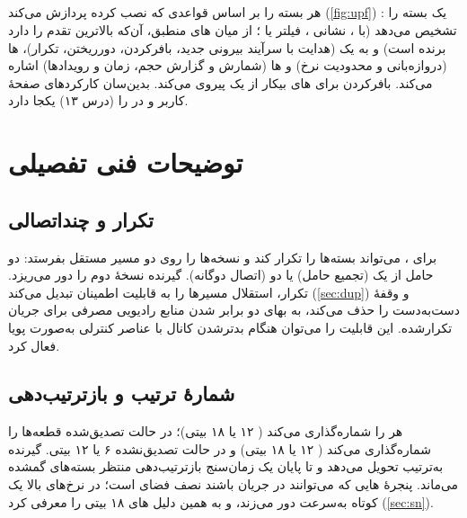 \documentclass[11pt,a4paper]{article}
\begin{document}
\begin{acnfigure}
  \caption{برخی تقسیم‌های کارکردی  با نرخ‌های تقریبی فرانت‌هال (فرض‌ها در \cref{sec:fh}).}
  \label{fig:splits}
\end{acnfigure}

\subsection{}
 هر بسته را بر اساس قواعدی که  نصب کرده پردازش می‌کند (\cref{fig:upf}) \cite{ts29244}: یک \emph{} بسته را تشخیص
می‌دهد (با ، نشانی ، فیلتر  یا ؛ از میان های منطبق، آن‌که بالاترین تقدم را دارد برنده است) و به یک
\emph{} (هدایت با سرآیند بیرونی جدید، بافرکردن، دورریختن، تکرار)، \emph{}ها (دروازه‌بانی و محدودیت نرخ) و
\emph{}ها (شمارش و گزارش حجم، زمان و رویدادها) اشاره می‌کند. بافرکردن برای های بیکار از یک \emph{} پیروی می‌کند.
بدین‌سان  کارکردهای صفحهٔ کاربر  و  در  را (درس ۱۳) یکجا دارد.

\begin{acnfigure}
  \caption{پردازش بسته در  با قواعد .}
  \label{fig:upf}
\end{acnfigure}

\section{توضیحات فنی تفصیلی}

\subsection{تکرار  و چنداتصالی}
برای ،  می‌تواند بسته‌ها را تکرار کند و نسخه‌ها را روی دو مسیر مستقل بفرستد: دو حامل از یک  (تجمیع حامل) یا دو
 (اتصال دوگانه).  گیرنده نسخهٔ دوم را دور می‌ریزد. تکرار، استقلال مسیرها را به قابلیت اطمینان تبدیل می‌کند (\cref{sec:dup})
و وقفهٔ دست‌به‌دست را حذف می‌کند، به بهای دو برابر شدن منابع رادیویی مصرفی برای جریان تکرارشده. این قابلیت را می‌توان هنگام بدترشدن کانال
با عناصر کنترلی  به‌صورت پویا فعال کرد.

\subsection{شمارهٔ ترتیب و بازترتیب‌دهی}
 هر  را شماره‌گذاری می‌کند ( ۱۲ یا ۱۸ بیتی)؛  در حالت تصدیق‌شده قطعه‌ها را شماره‌گذاری می‌کند ( ۱۲ یا ۱۸
بیتی) و در حالت تصدیق‌نشده ۶ یا ۱۲ بیتی.  گیرنده به‌ترتیب تحویل می‌دهد و تا پایان یک زمان‌سنج بازترتیب‌دهی منتظر بسته‌های گمشده
می‌ماند. پنجرهٔ هایی که می‌توانند در جریان باشند نصف فضای  است؛ در نرخ‌های بالا یک  کوتاه به‌سرعت دور می‌زند، و به
همین دلیل  های ۱۸ بیتی را معرفی کرد (\cref{sec:sn}).
\end{document}
